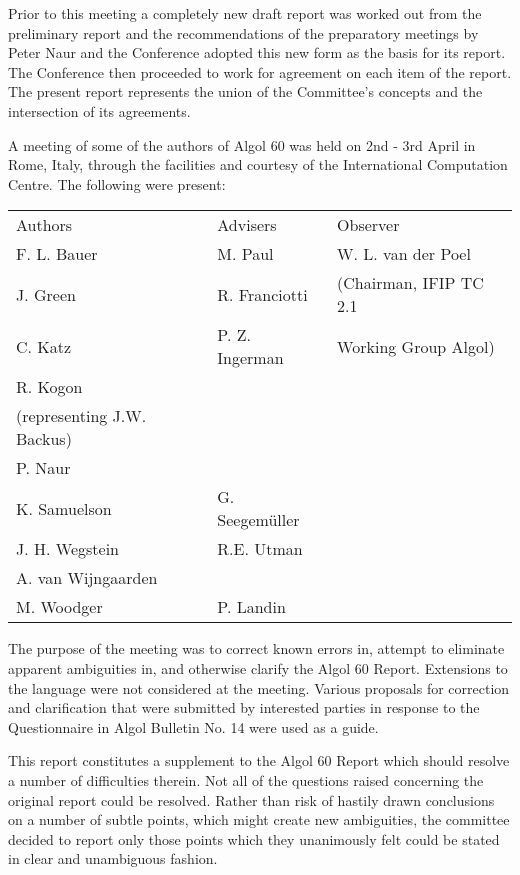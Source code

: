 \documentclass[a4paper,11pt]{article}
\begin{document}
Prior to this meeting a completely new draft report was worked out from
the preliminary report and the recommendations of the preparatory
meetings by Peter Naur and the Conference adopted this new form as the
basis for its report. The Conference then proceeded to work for
agreement on each item of the report. The present report represents the
union of the Committee's concepts and the intersection of its agreements.




A meeting of some of the authors of Algol 60 was held on 2nd - 3rd April
in Rome, Italy, through the facilities and courtesy of the International
Computation Centre.  The following were present:

\vspace{1em}
\begin{tabular*}{15.0cm}{lll}
Authors             & Advisers          & Observer \\
F. L. Bauer         & M. Paul           & W. L. van der Poel\\
J. Green            & R. Franciotti     & (Chairman, IFIP TC 2.1 \\
C. Katz             & P. Z. Ingerman    & Working Group Algol) \\
R. Kogon\\(representing J.W. Backus)   &&\\
P. Naur                                &&\\
K. Samuelson        & G. Seegem\"uller  &\\
J. H. Wegstein      & R.E. Utman        &\\
A. van Wijngaarden                     &&\\
M. Woodger          & P. Landin         &\\
\end{tabular*}
\vspace{1em}

The purpose of the meeting was to correct known errors in, attempt to
eliminate apparent ambiguities in, and otherwise clarify the Algol 60
Report.  Extensions to the language were not considered at the meeting. 
Various proposals for correction and clarification that were submitted
by interested parties in response to the Questionnaire in Algol Bulletin
No. 14 were used as a guide. 

This report constitutes a supplement to the Algol 60 Report which should
resolve a number of difficulties therein.  Not all of the questions
raised concerning the original report could be resolved.  Rather than
risk of hastily drawn conclusions on a number of subtle points, which
might create new ambiguities, the committee decided to report only those
points which they unanimously felt could be stated in clear and
unambiguous fashion. 
\end{document}

